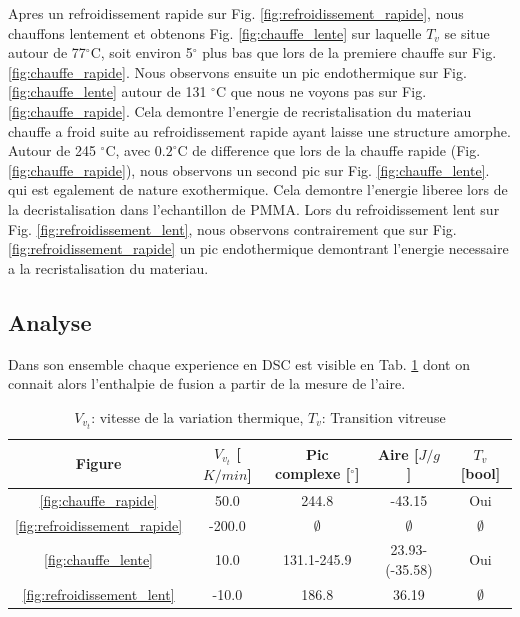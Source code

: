 Apres un refroidissement rapide sur Fig. \ref{fig:refroidissement_rapide}, nous chauffons lentement et obtenons Fig. \ref{fig:chauffe_lente} sur laquelle $T_v$ se situe autour de 77$^\circ$C, soit environ 5$^\circ$ plus bas que lors de la premiere chauffe sur Fig. \ref{fig:chauffe_rapide}. Nous observons ensuite un pic endothermique sur Fig. \ref{fig:chauffe_lente} autour de 131 $^\circ$C que nous ne voyons pas sur Fig. \ref{fig:chauffe_rapide}. Cela demontre l'energie de recristalisation du materiau chauffe a froid suite au refroidissement rapide ayant laisse une structure amorphe. Autour de 245 $^\circ$C, avec $0.2 ^\circ$C de difference que lors de la chauffe rapide (Fig. \ref{fig:chauffe_rapide}), nous observons un second pic sur Fig. \ref{fig:chauffe_lente}. qui est egalement de nature exothermique. Cela demontre l'energie liberee lors de la decristalisation dans l'echantillon de PMMA. Lors du refroidissement lent sur Fig. \ref{fig:refroidissement_lent}, nous observons contrairement que sur Fig. \ref{fig:refroidissement_rapide} un pic endothermique demontrant l'energie necessaire a la recristalisation du materiau.
\subsection{Analyse}

Dans son ensemble chaque experience en DSC est visible en Tab. \ref{val:peaks} dont on connait alors l'enthalpie de fusion a partir de la mesure de l'aire.
\begin{table}[!ht]
\centering
\footnotesize
\setlength{\tabcolsep}{4pt}
\renewcommand{\arraystretch}{0.9}
\begin{tabular}{|c|c|c|c|c|}
\hline
        \textbf{Figure}
        & \textbf{$V_v_t$ [$K/min$]}
        & \textbf{Pic complexe [$^\circ$]}
        & \textbf{Aire [$J/g$]}
        & \textbf{$T_v$ [bool]}
\\\hline
        \ref{fig:chauffe_rapide} & 50.0 & 244.8 & -43.15 & Oui  \\
        \ref{fig:refroidissement_rapide} & -200.0 & $\emptyset$ & $\emptyset$ & $\emptyset$  \\
        \ref{fig:chauffe_lente} & 10.0 & 131.1-245.9 & 23.93-(-35.58) & Oui \\
        \ref{fig:refroidissement_lent} & -10.0 & 186.8 & 36.19 & $\emptyset$ \\
\hline
\end{tabular}
        \caption{$V_v_t$: vitesse de la variation thermique, $T_v$: Transition vitreuse}
\label{val:peaks}
\end{table}

